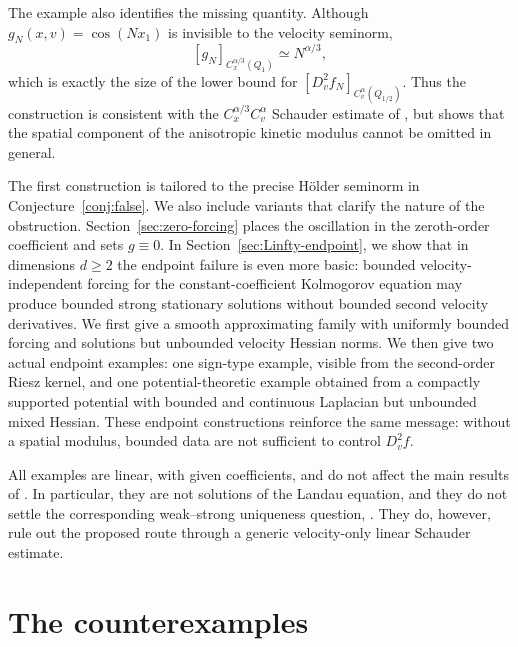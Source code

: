 \documentclass[10pt,a4paper]{amsart}
\numberwithin{equation}{section}
\begin{document}
The example also identifies the missing quantity.  Although
\(g_N(x,v)=\cos(Nx_1)\) is invisible to the velocity seminorm,
\[
   [g_N]_{C_x^{\alpha/3}(Q_1)}\simeq N^{\alpha/3},
\]
which is exactly the size of the lower bound for
\([D_v^2f_N]_{C_v^\alpha(Q_{1/2})}\).  Thus the construction is
consistent with the \(C_x^{\alpha/3}C_v^\alpha\) Schauder estimate of
\cite{HW,DongYastrzhembskiySchauder}, but shows that the spatial component of the anisotropic
kinetic modulus cannot be omitted in general.

The first construction is tailored to the precise H\"older seminorm in
Conjecture~\ref{conj:false}.  We also include variants that clarify the
nature of the obstruction.  Section~\ref{sec:zero-forcing} places the
oscillation in the zeroth-order coefficient and sets \(g\equiv0\).  In
Section~\ref{sec:Linfty-endpoint}, we show that in dimensions \(d\ge2\) the
endpoint failure is even more basic: bounded velocity-independent forcing for
the constant-coefficient Kolmogorov equation may produce bounded %
{strong} stationary solutions without bounded second velocity derivatives.  We first give a smooth
approximating family with uniformly bounded forcing and solutions but
unbounded velocity Hessian norms.  We then give two actual endpoint examples:
one sign-type example, visible from the second-order Riesz kernel, and one
potential-theoretic example obtained from a compactly supported potential with
bounded {and continuous} Laplacian but unbounded mixed Hessian.  These endpoint constructions
reinforce the same message: without a spatial modulus, bounded data are not sufficient to
control \(D_v^2 f\).

All examples are linear, with %
{given} coefficients, and do not
affect the main results of \cite{HW}.  In particular, they are not solutions
of the Landau equation, and they do not settle the corresponding weak--strong
uniqueness question, \cite[Conjecture 1.4]{HW}.  They do, however, rule out
the proposed route through a generic velocity-only linear Schauder estimate.

\section{The counterexamples}
\end{document}
